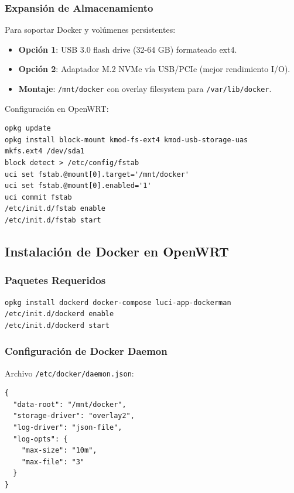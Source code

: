 \subsubsection{Expansión de Almacenamiento}

Para soportar Docker y volúmenes persistentes:

\begin{itemize}
    \item \textbf{Opción 1}: USB 3.0 flash drive (32-64 GB) formateado ext4.
    \item \textbf{Opción 2}: Adaptador M.2 NVMe vía USB/PCIe (mejor rendimiento I/O).
    \item \textbf{Montaje}: \texttt{/mnt/docker} con overlay filesystem para \texttt{/var/lib/docker}.
\end{itemize}

Configuración en OpenWRT:
\begin{verbatim}
opkg update
opkg install block-mount kmod-fs-ext4 kmod-usb-storage-uas
mkfs.ext4 /dev/sda1
block detect > /etc/config/fstab
uci set fstab.@mount[0].target='/mnt/docker'
uci set fstab.@mount[0].enabled='1'
uci commit fstab
/etc/init.d/fstab enable
/etc/init.d/fstab start
\end{verbatim}

\subsection{Instalación de Docker en OpenWRT}

\subsubsection{Paquetes Requeridos}

\begin{verbatim}
opkg install dockerd docker-compose luci-app-dockerman
/etc/init.d/dockerd enable
/etc/init.d/dockerd start
\end{verbatim}

\subsubsection{Configuración de Docker Daemon}

Archivo \texttt{/etc/docker/daemon.json}:
\begin{verbatim}
{
  "data-root": "/mnt/docker",
  "storage-driver": "overlay2",
  "log-driver": "json-file",
  "log-opts": {
    "max-size": "10m",
    "max-file": "3"
  }
}
\end{verbatim}

